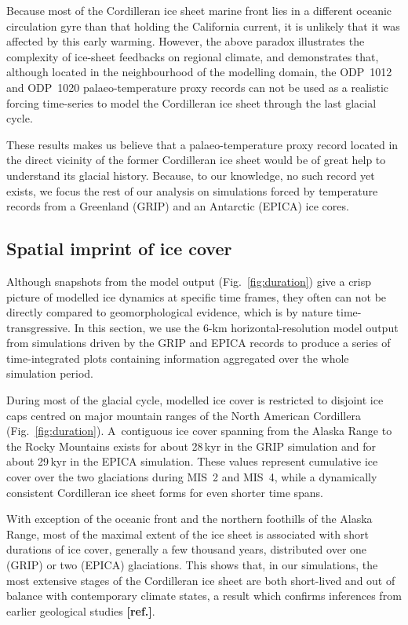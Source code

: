 \documentclass[tc, ms]{copernicus}
\newcommand{\aref}[0]{\textbf{[ref.]}}
\begin{document}
Because most of the Cordilleran ice sheet marine front lies in a different
oceanic circulation gyre than that holding the California current, it is
unlikely that it was affected by this early warming. However, the above paradox
illustrates the complexity of ice-sheet feedbacks on regional climate, and
demonstrates that, although located in the neighbourhood of the modelling
domain, the ODP~1012 and ODP~1020 palaeo-temperature proxy records can not be
used as a realistic forcing time-series to model the Cordilleran ice sheet
through the last glacial cycle.

These results makes us believe that a palaeo-temperature proxy record located
in the direct vicinity of the former Cordilleran ice sheet would be of great
help to understand its glacial history. Because, to our knowledge, no such
record yet exists, we focus the rest of our analysis on simulations forced by
temperature records from a Greenland (GRIP) and an Antarctic (EPICA) ice cores.

\subsection{Spatial imprint of ice cover}

Although snapshots from the model output (Fig.~\ref{fig:duration}) give a
crisp picture of modelled ice dynamics at specific time frames, they often
can not be directly compared to geomorphological evidence, which is by nature
time-transgressive. In this section, we use the 6-km horizontal-resolution
model output from simulations driven by the GRIP and EPICA records to produce
a series of time-integrated plots containing information aggregated over the
whole simulation period.

During most of the glacial cycle, modelled ice cover is restricted to disjoint
ice caps centred on major mountain ranges of the North American Cordillera
(Fig.~\ref{fig:duration}). A~contiguous ice cover spanning from the Alaska
Range to the Rocky Mountains exists for about 28\,\unit{kyr} in the GRIP
simulation and for about 29\,\unit{kyr} in the EPICA simulation. These values
represent cumulative ice cover over the two glaciations during MIS~2 and MIS~4,
while a dynamically consistent Cordilleran ice sheet forms for even shorter
time spans.

With exception of the oceanic front and the northern foothills of the Alaska
Range, most of the maximal extent of the ice sheet is associated with short
durations of ice cover, generally a few thousand years, distributed over one
(GRIP) or two (EPICA) glaciations. This shows that, in our simulations, the
most extensive stages of the Cordilleran ice sheet are both short-lived and
out of balance with contemporary climate states, a result which confirms
inferences from earlier geological studies \aref.
\end{document}
